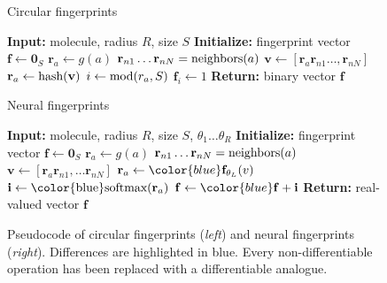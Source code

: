 \documentclass{article}
\newcommand{\vv}{\mathbf{v}}
\newcommand{\vf}{\mathbf{f}}
\newcommand{\vi}{\mathbf{i}}
\newcommand{\vr}{\mathbf{r}}
\newcommand{\vzero}{\mathbf{0}}
\begin{document}
\begin{figure}[t]
 \begin{minipage}[t]{0.49\columnwidth}
 \begin{algorithm}[H]
\caption{Circular fingerprints} 
\label{alg:ecfp} 
\begin{algorithmic}[1]
\State \textbf{Input:} {molecule, radius $R$, size $S$}
\State \textbf{Initialize:} {fingerprint vector $\vf \leftarrow \vzero_S$}
    \State $\vr_a \leftarrow g(a)$ 
\EndFor
{} 
		\State $\vr_{n1} \dots \vr_{nN} = \textnormal{neighbors}(a)$
		\State $\vv \leftarrow [\vr_a \vr_{n1} \dots, \vr_{nN}]$ 
		\State $\vr_a \leftarrow \textnormal{hash}(\vv)$ 
		\State $i \leftarrow \textnormal{mod}(r_a, S)$ 		
		\State $\vf_{i} \leftarrow 1$ 
	\EndFor
\EndFor
\State \textbf{Return:} {binary vector $\vf$}
\end{algorithmic}
\end{algorithm}
\end{minipage}
\hfill
\begin{minipage}[t]{0.49\columnwidth}
\begin{algorithm}[H]
\caption{Neural fingerprints} 
\label{alg:neural} 
\begin{algorithmic}[1]
\State \textbf{Input:} {molecule, radius $R$, size $S$, {\color{blue} $\theta_1 \dots \theta_R$}}
\State \textbf{Initialize:} {fingerprint vector $\vf \leftarrow \vzero_S$}
	\State $\vr_a \leftarrow g(a)$ 
\EndFor
{} 
		\State $\vr_{n1} \dots \vr_{nN} = \textnormal{neighbors}(a)$
		\State $\vv \leftarrow [\vr_a \vr_{n1}, \dots \vr_{nN}]$ 
		\State $\vr_a \leftarrow {\color{blue} \vf_{\theta_L}}(v)$ 
		\State $\vi \leftarrow \textnormal{{\color{blue}softmax}}(\vr_a)$ 
		\State $\vf \leftarrow {\color{blue} \vf + \vi}$ 
    \EndFor
\EndFor
\State \textbf{Return:} { {\color{blue} real-valued} vector $\vf$}
\end{algorithmic}
\end{algorithm}
\end{minipage}
\hfill
\caption{Pseudocode of circular fingerprints (\emph{left}) and neural fingerprints (\emph{right}).
Differences are highlighted in blue.
Every non-differentiable operation has been replaced with a differentiable analogue.}
\end{figure}
\end{document}
